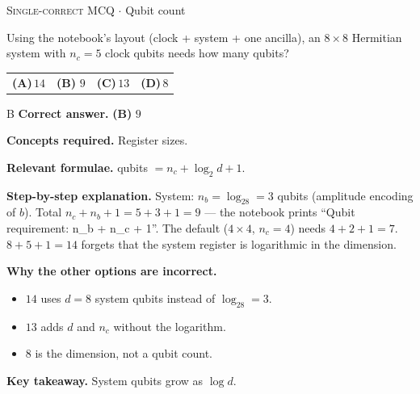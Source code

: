 \documentclass[11pt,a4paper]{article}
\newcommand{\optlabel}[1]{\textbf{(#1)}}
\newcommand{\correctlabel}[1]{\textcolor{okgreen}{\textbf{(#1)}\,\ding{51}}}
\newenvironment{qitem}[1]{\begin{list}{}{\setlength{\leftmargin}{3.3em}\setlength{\labelwidth}{3.1em}%
  \setlength{\labelsep}{0.2em}\setlength{\topsep}{3pt}\setlength{\parsep}{3pt}}\item[\textbf{Q.#1}\hfill]}{\end{list}}
\newcommand{\qsep}{\par\vspace{2pt}{\color{black!15}\hrule}\vspace{4pt}}
\newcommand{\qmeta}[2]{{\footnotesize\color{black!60}\textsc{#1} \;$\cdot$\; #2}\par}
\begin{document}
\qsep

\begin{qitem}{42}
\qmeta{Single-correct MCQ}{Qubit count}
Using the notebook's layout (clock + system + one ancilla), an $8\times8$ Hermitian system with $n_c = 5$ clock qubits needs how many qubits?
\par\smallskip\noindent\begin{tabularx}{\linewidth}{@{}*{4}{L}@{}}
\optlabel{A}\,$14$ & \correctlabel{B}\,$9$ & \optlabel{C}\,$13$ & \optlabel{D}\,$8$
\end{tabularx}
\end{qitem}
\begin{solbox}{B}
\textbf{\color{brand}Correct answer.} \textcolor{okgreen}{\textbf{(B)}} $9$

\textbf{\color{brand}Concepts required.} Register sizes.

\textbf{\color{brand}Relevant formulae.} qubits $= n_c + \log_2d + 1$.

\textbf{\color{brand}Step-by-step explanation.} System: $n_b = \log_28 = 3$ qubits (amplitude encoding of $b$). Total $n_c + n_b + 1 = 5 + 3 + 1 = 9$ --- the notebook prints ``Qubit requirement: n\_b + n\_c + 1''. The
default ($4\times4$, $n_c = 4$) needs $4 + 2 + 1 = 7$. $8 + 5 + 1 = 14$ forgets that the system register is logarithmic in the dimension.

\textbf{\color{brand}Why the other options are incorrect.}
\begin{itemize}[leftmargin=2.4em, itemsep=1pt, topsep=2pt]
\item[\textbf{(A)}] $14$ uses $d = 8$ system qubits instead of $\log_28 = 3$.
\item[\textbf{(C)}] $13$ adds $d$ and $n_c$ without the logarithm.
\item[\textbf{(D)}] $8$ is the dimension, not a qubit count.
\end{itemize}
\textbf{\color{brand}Key takeaway.} System qubits grow as $\log d$.
\end{solbox}
\qsep
\end{document}
